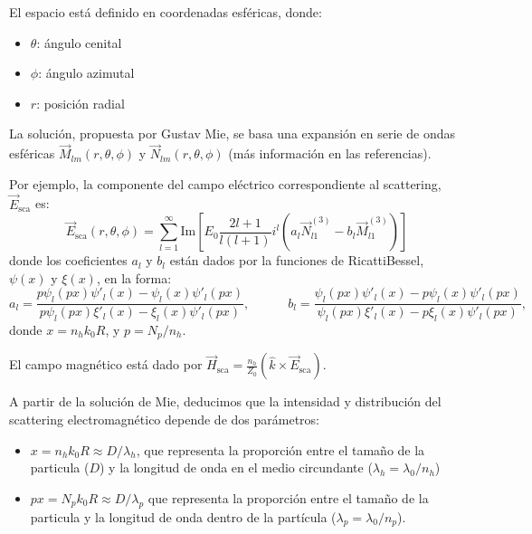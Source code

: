 \documentclass[letterpaper,10pt,english]{jupyterBook}
\begin{document}
\sphinxAtStartPar
El espacio está definido en coordenadas esféricas, donde:
\begin{itemize}
\item {} 
\sphinxAtStartPar
\(\theta\): ángulo cenital

\item {} 
\sphinxAtStartPar
\(\phi\): ángulo azimutal

\item {} 
\sphinxAtStartPar
\(r\): posición radial

\end{itemize}

\sphinxAtStartPar
La solución, propuesta por Gustav Mie, se basa una expansión en serie de ondas esféricas \(\vec{M}_{lm}(r, \theta,\phi)\) y \(\vec{N}_{lm}(r, \theta,\phi)\) (más información en las referencias).

\sphinxAtStartPar
Por ejemplo, la componente del campo eléctrico correspondiente al scattering, \(\vec{E}_\mathrm{sca}\) es:
\begin{equation*}
\vec{E}_\mathrm{sca}(r, \theta,\phi) = \sum_{l=1}^\infty \mathrm{Im}\left[E_0\frac{2l+1}{l(l+1)}i^l\left(a_l \vec{N}_{l1}^{(3)} - b_l \vec{M}_{l1}^{(3)}\right)\right]
\end{equation*}
\sphinxAtStartPar
donde los coeficientes \(a_l\) y \(b_l\) están dados por la funciones de Ricatti\sphinxhyphen{}Bessel, \(\psi(x)\) y \(\xi(x)\), en la forma:
\begin{equation*}
a_l = \frac{p\psi_l(px)\psi'_l(x) - \psi_l(x)\psi'_l(px)}{p\psi_l(px)\xi'_l(x) - \xi_l(x)\psi'_l(px)},
\quad\quad\quad
b_l = \frac{\psi_l(px)\psi'_l(x) - p\psi_l(x)\psi'_l(px)}{\psi_l(px)\xi'_l(x) - p\xi_l(x)\psi'_l(px)},
\end{equation*}
\sphinxAtStartPar
donde \(x = n_hk_0R\), y \(p = N_p/n_h\).

\sphinxAtStartPar
El campo magnético está dado por \(\vec{H}_\mathrm{sca} = \frac{n_h}{Z_0} \left(\hat{k}\times\vec{E}_\mathrm{sca}\right)\).

\sphinxAtStartPar
A partir de la solución de Mie, deducimos que la intensidad y distribución del scattering electromagnético depende de dos parámetros:
\begin{itemize}
\item {} 
\sphinxAtStartPar
\(x = n_hk_0R\approx D/\lambda_h\), que representa la proporción entre el tamaño de la particula (\(D\)) y la longitud de onda en el medio circundante (\(\lambda_h= \lambda_0/n_h\))

\item {} 
\sphinxAtStartPar
\(px = N_pk_0R\approx D/\lambda_p\) que representa la proporción entre el tamaño de la particula y la longitud de onda dentro de la partícula (\(\lambda_p=\lambda_0/n_p\)).

\end{itemize}
\end{document}
